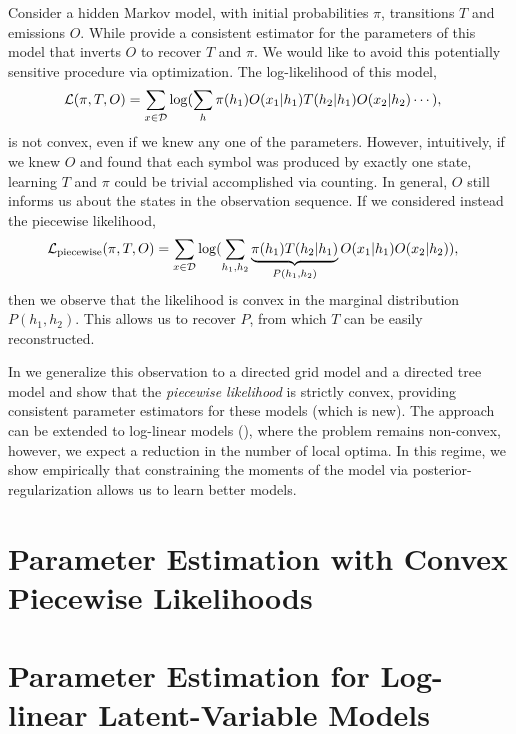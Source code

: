 \documentclass{article}
\begin{document}
Consider a hidden Markov model, with initial probabilities $\pi$,
  transitions $T$ and emissions $O$. 
While \citet{hsu09spectral,anandkumar12moments} provide a consistent estimator
  for the parameters of this model that inverts $O$ to recover $T$ and
  $\pi$. We would like to avoid this potentially sensitive procedure via optimization.
The log-likelihood of this model, 
  \begin{align}
    \mathcal{L}(\pi, T, O) &= \sum_{x\in\mathcal{D}} \log( \sum_{h} \pi(h_1) O(x_1 | h_1) T(h_2 | h_1) O(x_2 | h_2) \cdots ),
  \end{align}
  is not convex, even if we knew any one of the parameters.
However, intuitively, if we knew $O$ and found that each symbol was
  produced by exactly one state, learning $T$ and $\pi$ could be trivial
  accomplished via counting. 
In general, $O$ still informs us about the states in the observation
  sequence. If we considered instead the piecewise likelihood, 
  \begin{align}
    \mathcal{L}_{\textrm{piecewise}}(\pi, T, O) &= \sum_{x\in\mathcal{D}} \log( \sum_{h_1, h_2} \underbrace{\pi(h_1) T(h_2 | h_1)}_{P(h_1,h_2)} O(x_1 | h_1) O(x_2 | h_2) ),
  \end{align}
  then we observe that the likelihood is convex in the marginal
  distribution $P(h_1,h_2)$. This allows us to recover $P$, from which $T$
  can be easily reconstructed.

In  we generalize this observation to a directed grid
  model and a directed tree model and show that the {\em piecewise
  likelihood} is strictly convex, providing consistent parameter
  estimators for these models (which is new)\reword.
The approach can be extended to log-linear
  models (), where the problem remains non-convex,
  however, we expect a reduction in the number of local optima. 
In this regime, we show empirically that constraining the moments of the
  model via posterior-regularization allows us to learn better models.


\section{Parameter Estimation with Convex Piecewise Likelihoods}
\label{sec:piecewise}

\section{Parameter Estimation for Log-linear Latent-Variable Models}
\label{sec:log-linear}
\end{document}
